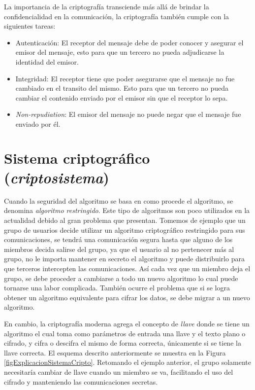 La importancia de la criptografía transciende más allá de brindar la confidencialidad en la comunicación, la criptografía también cumple con la siguientes tareas:
\begin{itemize}
\item Autenticación: El receptor del mensaje debe de poder conocer y asegurar el emisor del mensaje, esto para que un tercero no pueda adjudicarse la identidad del emisor.
\item Integridad: El receptor tiene que poder asegurarse que el mensaje no fue cambiado en el transito del mismo. Esto para que un tercero no pueda cambiar el contenido enviado por el emisor sin que el receptor lo sepa.
\item \textit{Non-repudiation}: El emisor del mensaje no puede negar que el mensaje fue enviado por él. 
\end{itemize}

\section{Sistema criptográfico (\textit{criptosistema})}
Cuando la seguridad del algoritmo se basa en como procede el algoritmo, se denomina \textit{algoritmo restringido}. Este tipo de algoritmos son poco utilizados en la actualidad debido al gran problema que presentan. Tomemos de ejemplo que un grupo de usuarios decide utilizar un algoritmo criptográfico restringido para sus comunicaciones, se tendrá una comunicación segura hasta que alguno de los miembros decida salirse del grupo, ya que el usuario al no pertenecer más al grupo, no le importa mantener en secreto el algoritmo y puede distribuirlo para que terceros intercepten las comunicaciones. Así cada vez que un miembro deja el grupo, se debe proceder a cambiarse a todo un nuevo algoritmo lo cual puede tornarse una labor complicada. También ocurre el problema que si se logra obtener un algoritmo equivalente para cifrar los datos, se debe migrar a un nuevo algoritmo.

En cambio, la criptografía moderna \citep{denning} agrega el concepto de \textit{llave} donde se tiene un algoritmo el cual toma como parámetros de entrada una llave y el texto plano o cifrado, y cifra o descifra el mismo de forma correcta, únicamente si se tiene la llave correcta. El esquema descrito anteriormente se muestra en la Figura \ref{figExplicacionSistemaCripto}. Retomando el ejemplo anterior, el grupo solamente necesitaría cambiar de llave cuando un miembro se va, facilitando el uso del cifrado y manteniendo las comunicaciones secretas. 

